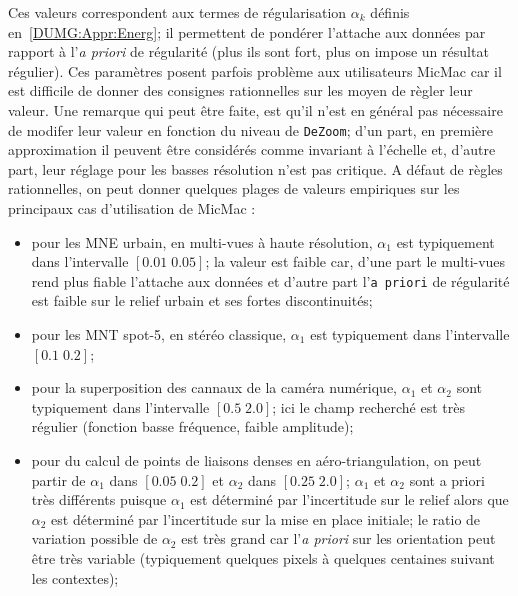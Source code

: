 Ces valeurs correspondent aux termes de r\'egularisation 
$\alpha_k$  d\'efinis en~\ref{DUMG:Appr:Energ};  il permettent
de pond\'erer l'attache aux donn\'ees par rapport \`a l'\emph{a priori}
de r\'egularit\'e (plus ils sont fort, plus on impose un r\'esultat
r\'egulier).
Ces param\`etres posent parfois probl\`eme aux utilisateurs
MicMac car il est difficile de donner  des  consignes rationnelles
sur les moyen de r\`egler leur valeur. Une  remarque
qui peut \^etre faite, est qu'il n'est en g\'en\'eral pas
n\'ecessaire de modifer leur valeur en fonction du niveau
de {\tt DeZoom}; d'un part, en premi\`ere approximation il
peuvent \^etre consid\'er\'es comme invariant \`a l'\'echelle et,
d'autre part, leur r\'eglage pour les basses r\'esolution n'est 
pas critique. A d\'efaut de r\`egles rationnelles, on peut 
donner quelques plages de valeurs empiriques sur les principaux
cas d'utilisation de MicMac :


\begin{itemize}
    \item pour les MNE urbain, en multi-vues \`a haute r\'esolution,
          $\alpha_1$ est typiquement dans l'intervalle $[0.01 \; 0.05]$;
          la valeur est faible car, d'une part le multi-vues rend plus
          fiable l'attache aux donn\'ees et d'autre part l'{\tt a priori}
          de r\'egularit\'e est faible sur 
          le relief urbain et  ses fortes discontinuit\'es;

    \item pour les MNT spot-5, en st\'er\'eo classique, 
           $\alpha_1$ est typiquement dans l'intervalle $[0.1 \; 0.2]$;
          
    \item pour la superposition des cannaux de la cam\'era num\'erique,
           $\alpha_1$ et  $\alpha_2$ sont typiquement dans l'intervalle 
           $[0.5 \; 2.0]$; ici le champ recherch\'e est tr\`es
           r\'egulier (fonction basse fr\'equence, faible amplitude);

    \item pour du calcul de points de liaisons denses en a\'ero-triangulation,
          on peut partir de  $\alpha_1$ dans $[0.05 \; 0.2]$ et $\alpha_2$
          dans $[0.25 \; 2.0]$; $\alpha_1$ et  $\alpha_2$ sont a priori
          tr\`es diff\'erents puisque  $\alpha_1$ est d\'etermin\'e par
          l'incertitude sur le relief alors que $\alpha_2$ est d\'etermin\'e
          par l'incertitude sur la mise en place initiale; le ratio
          de variation possible de $\alpha_2$ est tr\`es grand car 
          l'\emph{a priori} sur les orientation peut \^etre tr\`es
          variable (typiquement quelques pixels \`a quelques centaines
          suivant les contextes);

\end{itemize}

